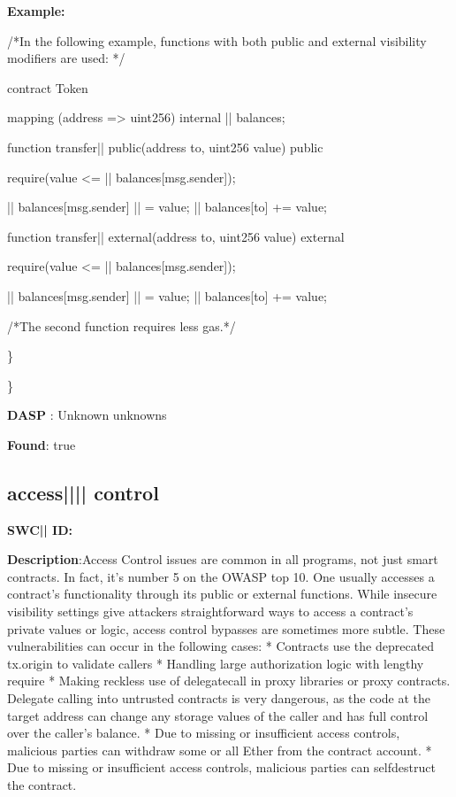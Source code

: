 \documentclass{article}
\begin{document}
\textbf{Example:} 
\begin{ffcode} 

 /*In the following example, functions with both public and external visibility modifiers are used: */ 

contract Token {

    mapping (address => uint256) internal |\textunderscore| balances;

    function transfer|\textunderscore| public(address to, uint256 value) public {
        require(value <= |\textunderscore| balances[msg.sender]);

        |\textunderscore| balances[msg.sender] |\textendash| = value;
        |\textunderscore| balances[to] += value;
    }

    function transfer|\textunderscore| external(address to, uint256 value) external {
        require(value <= |\textunderscore| balances[msg.sender]);

        |\textunderscore| balances[msg.sender] |\textendash| = value;
        |\textunderscore| balances[to] += value;
    }
}

 /*The second function requires less gas.*/ 

\end{ffcode} 
\} 

\} 

\textbf{DASP} : Unknown unknowns

\textbf{Found}: true

\subsection{access{||\textunderscore|| }control} 
\textbf{SWC{|\textunderscore| }ID:} 

\textbf{Description}:Access Control issues are common in all programs, not just smart contracts. In fact, it's number 5 on the OWASP top 10. One usually accesses a contract's functionality through its public or external functions. While insecure visibility settings give attackers straightforward ways to access a contract's private values or logic, access control bypasses are sometimes more subtle. These vulnerabilities can occur in the following cases:
* Contracts use the deprecated tx.origin to validate callers
* Handling large authorization logic with lengthy require
* Making reckless use of delegatecall in proxy libraries or proxy contracts. Delegate calling into untrusted contracts is very dangerous, as the code at the target address can change any storage values of the caller and has full control over the caller's balance.
* Due to missing or insufficient access controls, malicious parties can withdraw some or all Ether from the contract account.
* Due to missing or insufficient access controls, malicious parties can self{\textendash}destruct the contract.
\end{document}

